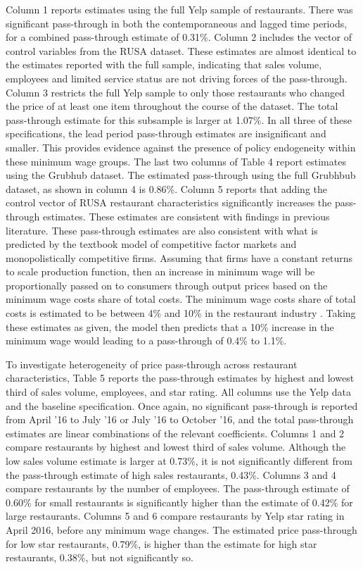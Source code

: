 \documentclass[11pt]{article}
\begin{document}
Column 1 reports estimates using the full Yelp sample of restaurants. There was significant pass-through in both the contemporaneous and lagged time periods, for a combined pass-through estimate of 0.31\%. Column 2 includes the vector of control variables from the RUSA dataset. These estimates are almost identical to the estimates reported with the full sample, indicating that sales volume, employees and limited service status are not driving forces of the pass-through. Column 3 restricts the full Yelp sample to only those restaurants who changed the price of at least one item throughout the course of the dataset. The total pass-through estimate for this subsample is larger at 1.07\%. In all three of these specifications, the lead period pass-through estimates are insignificant and smaller. This provides evidence against the presence of policy endogeneity within these minimum wage groups. The last two columns of Table 4 report estimates using the Grubhub dataset. The estimated pass-through using the full Grubhbub dataset, as shown in column 4 is 0.86\%. Column 5 reports that adding the control vector of RUSA restaurant characteristics significantly increases the pass-through estimates. These estimates are consistent with findings in previous literature. These pass-through estimates are also consistent with what is predicted by the textbook model of competitive factor markets and monopolistically competitive firms. Assuming that firms have a constant returns to scale production function, then an increase in minimum wage will be proportionally passed on to consumers through output prices based on the minimum wage costs share of total costs. The minimum wage costs share of total costs is estimated to be between 4\% and 10\% in the restaurant industry \cite{census, aaronson2007product}. Taking these estimates as given, the model then predicts that a 10\% increase in the minimum wage would leading to a pass-through of 0.4\% to 1.1\%.

To investigate heterogeneity of price pass-through across restaurant characteristics, Table 5 reports the pass-through estimates by highest and lowest third of sales volume, employees, and star rating. All columns use the Yelp data and the baseline specification. Once again, no significant pass-through is reported from April '16 to July '16 or July '16 to October '16, and the total pass-through estimates are linear combinations of the relevant coefficients. Columns 1 and 2 compare restaurants by highest and lowest third of sales volume. Although the low sales volume estimate is larger at 0.73\%, it is not significantly different from the pass-through estimate of high sales restaurants, 0.43\%. Columns 3 and 4 compare restaurants by the number of employees. The pass-through estimate of 0.60\% for small restaurants is significantly higher than the estimate of 0.42\% for large restaurants. Columns 5 and 6 compare restaurants by Yelp star rating in April 2016, before any minimum wage changes. The estimated price pass-through for low star restaurants, 0.79\%, is higher than the estimate for high star restaurants, 0.38\%, but not significantly so. 
\end{document}
